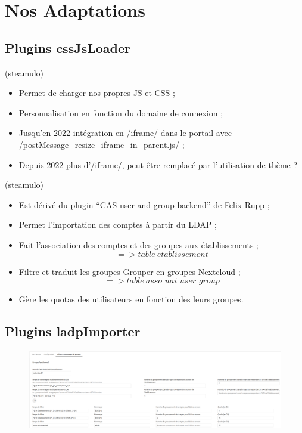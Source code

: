 \section{Nos Adaptations}
\subsection{Plugins cssJsLoader}
\begin{frame}[fragile]{\sub}{(steamulo)}
\begin{itemize}
\item Permet de charger nos propres JS et CSS ;
\item Personnalisation en fonction du domaine de connexion ;
\item Jusqu'en 2022 intégration en \code/iframe/ dans le portail avec \code/postMessage_resize_iframe_in_parent.js/ ;
\item Depuis 2022 plus d'\code/iframe/, peut-être remplacé par l'utilisation de thème ? 
\end{itemize}
\end{frame} 


\begin{frame}{\sub}{(steamulo)} %
\begin{itemize}
\item Est dérivé du plugin ``CAS user and group backend'' de Felix Rupp ;
\item Permet l'importation des comptes à partir du LDAP ;
\item Fait l'association des comptes et des groupes aux établissements ;
		{\small $$ => table\ etablissement $$} 
\item Filtre et traduit les groupes Grouper en groupes Nextcloud ;
		{\small $$ => table\ asso\_uai\_user\_group $$ } 
\item Gère les quotas des utilisateurs en fonction des leurs groupes.
\end{itemize}
\end{frame}

\subsection{Plugins ladpImporter}
\begin{frame}{\sub} %
\begin{figure}
\includegraphics[width=\textwidth, height=0.85\textheight]{ldapimporter.png}
\end{figure}
\end{frame}

